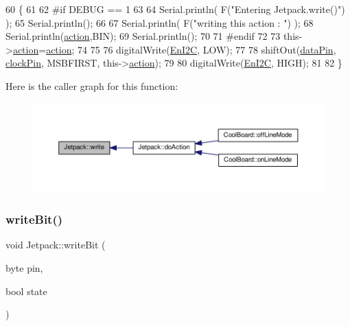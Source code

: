 \begin{DoxyCode}
60 \{
61 
62 \textcolor{preprocessor}{#if DEBUG == 1}
63 
64     Serial.println( F(\textcolor{stringliteral}{"Entering Jetpack.write()"}) );
65     Serial.println();
66 
67     Serial.println( F(\textcolor{stringliteral}{"writing this action : "}) );
68     Serial.println(\hyperlink{classJetpack_aca3142925a7b0834b34ae91d26af7765}{action},BIN);
69     Serial.println();
70 
71 \textcolor{preprocessor}{#endif }
72 
73     this->\hyperlink{classJetpack_aca3142925a7b0834b34ae91d26af7765}{action}=\hyperlink{classJetpack_aca3142925a7b0834b34ae91d26af7765}{action};
74 
75     
76     digitalWrite(\hyperlink{classJetpack_a81df984fb4cea98c71aa1a1cfcdfe814}{EnI2C}, LOW);
77     
78     shiftOut(\hyperlink{classJetpack_a3d669a56e93c71dd25f970d4ed7d0c00}{dataPin}, \hyperlink{classJetpack_a58ebb991f358f3ae94e82148b0221b5a}{clockPin}, MSBFIRST, this->\hyperlink{classJetpack_aca3142925a7b0834b34ae91d26af7765}{action});
79 
80     digitalWrite(\hyperlink{classJetpack_a81df984fb4cea98c71aa1a1cfcdfe814}{EnI2C}, HIGH);
81 
82 \}   
\end{DoxyCode}
Here is the caller graph for this function\+:\nopagebreak
\begin{figure}[H]
\begin{center}
\leavevmode
\includegraphics[width=350pt]{classJetpack_a338f1af8cbc6504ac69b47c7328569b5_icgraph}
\end{center}
\end{figure}
\mbox{\label{classJetpack_a79ae7bc3c1828a0551a7c005c4f8bd00}} 
\subsubsection{\texorpdfstring{write\+Bit()}{writeBit()}}
{\footnotesize\ttfamily void Jetpack\+::write\+Bit (\begin{DoxyParamCaption}\item[{byte}]{pin,  }\item[{bool}]{state }\end{DoxyParamCaption})}

